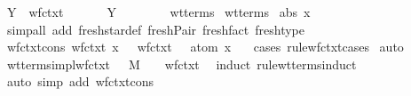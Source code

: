 \begin{isabellebody}
{\isacharbar}\ Y{\isacharcolon}\ {\isachardoublequoteopen}{\isasymlbrakk}\ wf{\isacharunderscore}ctxt\ {\isasymGamma}\ {\isasymrbrakk}\ {\isasymLongrightarrow}\ \ {\isasymGamma}\ {\isasymturnstile}\ Y\ {\isasymsigma}\ {\isacharcolon}\ {\isacharparenleft}{\isasymsigma}\ {\isasymrightarrow}\ {\isasymsigma}{\isacharparenright}\ {\isasymrightarrow}\ {\isasymsigma}{\isachardoublequoteclose}\isanewline
{}\isamarkupfalse%
\ wt{\isacharunderscore}terms\isanewline
\isanewline
{}\isamarkupfalse%
\ wt{\isacharunderscore}terms\isanewline
{}\ abs{\isacharcolon}\ {\isachardoublequoteopen}x{\isachardoublequoteclose}\ \isanewline
%
\isadelimproof
%
\endisadelimproof
%
\isatagproof
{}\isamarkupfalse%
\ {\isacharparenleft}simp{\isacharunderscore}all\ add{\isacharcolon}\ fresh{\isacharunderscore}star{\isacharunderscore}def\ fresh{\isacharunderscore}Pair\ fresh{\isacharunderscore}fact\ fresh{\isacharunderscore}type{\isacharparenright}%
\endisatagproof
{\isafoldproof}%
%
\isadelimproof
%
\endisadelimproof
%
\isamarkuptrue%
\isamarkupfalse%
\ wf{\isacharunderscore}ctxt{\isacharunderscore}cons{\isacharcolon}\ {\isachardoublequoteopen}wf{\isacharunderscore}ctxt\ {\isacharparenleft}{\isacharparenleft}x{\isacharcomma}\ {\isasymsigma}{\isacharparenright}{\isacharhash}{\isasymGamma}{\isacharparenright}\ {\isasymLongrightarrow}\ wf{\isacharunderscore}ctxt\ {\isasymGamma}\ {\isasymand}\ atom\ x\ {\isasymsharp}\ {\isasymGamma}{\isachardoublequoteclose}\isanewline
%
\isadelimproof
%
\endisadelimproof
%
\isatagproof
{}\isamarkupfalse%
\ {\isacharparenleft}cases\ rule{\isacharcolon}wf{\isacharunderscore}ctxt{\isachardot}cases{\isacharparenright}\isanewline
{}\isamarkupfalse%
\ auto%
\endisatagproof
{\isafoldproof}%
%
\isadelimproof
\isanewline
%
\endisadelimproof
\isanewline
{}\isamarkupfalse%
\ wt{\isacharunderscore}terms{\isacharunderscore}impl{\isacharunderscore}wf{\isacharunderscore}ctxt{\isacharcolon}\ {\isachardoublequoteopen}{\isasymGamma}\ {\isasymturnstile}\ M\ {\isacharcolon}\ {\isasymsigma}\ {\isasymLongrightarrow}\ wf{\isacharunderscore}ctxt\ {\isasymGamma}{\isachardoublequoteclose}\isanewline
%
\isadelimproof
%
\endisadelimproof
%
\isatagproof
{}\isamarkupfalse%
\ {\isacharparenleft}induct\ rule{\isacharcolon}wt{\isacharunderscore}terms{\isachardot}induct{\isacharparenright}\isanewline
{}\isamarkupfalse%
\ {\isacharparenleft}auto\ simp\ add{\isacharcolon}\ wf{\isacharunderscore}ctxt{\isacharunderscore}cons{\isacharparenright}%

\end{isabellebody}
